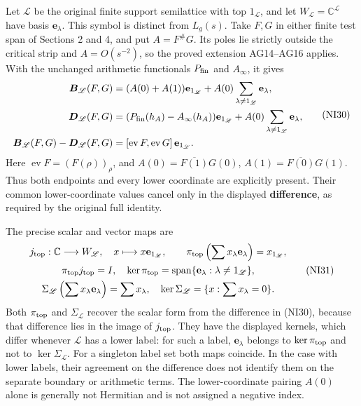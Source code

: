 \documentclass[
  10pt,
  a4paper,
]{article}
\begin{document}
Let \(\mathscr L\) be the original finite support semilattice with top
\(1_{\mathscr L}\), and let \(W_{\mathscr L}=\mathbb C^{\mathscr L}\)
have basis \(\mathbf e_\lambda\). This symbol is distinct from
\(L_g(s)\). Take \(F,G\) in either finite test span of Sections 2 and 4,
and put \(A=F^\#G\). Its poles lie strictly outside the critical strip
and \(A=O(s^{-2})\), so the proved extension AG14--AG16 applies. With
the unchanged arithmetic functionals \(P_{\rm fin}\) and \(A_\infty\),
it gives \[
\begin{split}
\boldsymbol B_{\mathscr L}(F,G)
&=(A(0)+A(1))\mathbf e_{1_{\mathscr L}}
+A(0)\sum_{\lambda\ne1_{\mathscr L}}\mathbf e_\lambda,\\
\boldsymbol D_{\mathscr L}(F,G)
&=(P_{\rm fin}(h_A)-A_\infty(h_A))\mathbf e_{1_{\mathscr L}}
+A(0)\sum_{\lambda\ne1_{\mathscr L}}\mathbf e_\lambda,\\
\boldsymbol B_{\mathscr L}(F,G)-\boldsymbol D_{\mathscr L}(F,G)
&=[\operatorname{ev}F,\operatorname{ev}G]\,\mathbf e_{1_{\mathscr L}}.
\end{split}
\tag{NI30}
\] Here \(\operatorname{ev}F=(F(\rho))_\rho\), and
\(A(0)=\overline{F(1)}G(0)\), \(A(1)=\overline{F(0)}G(1)\). Thus both
endpoints and every lower coordinate are explicitly present. Their
common lower-coordinate values cancel only in the displayed
\textbf{difference}, as required by the original full identity.

The precise scalar and vector maps are \[
\begin{gathered}
j_{\rm top}:\mathbb C\longrightarrow W_{\mathscr L},\quad
x\longmapsto x\mathbf e_{1_{\mathscr L}},\qquad
\pi_{\rm top}\left(\sum x_\lambda\mathbf e_\lambda\right)=x_{1_{\mathscr L}},\\
\pi_{\rm top}j_{\rm top}=I,\quad
\ker\pi_{\rm top}=\operatorname{span}\{\mathbf e_\lambda:\lambda\ne1_{\mathscr L}\},\\
\Sigma_{\mathscr L}\left(\sum x_\lambda\mathbf e_\lambda\right)=\sum x_\lambda,
\quad \ker\Sigma_{\mathscr L}=\{x:\sum x_\lambda=0\}.
\end{gathered}
\tag{NI31}
\] Both \(\pi_{\rm top}\) and \(\Sigma_{\mathscr L}\) recover the scalar
form from the difference in (NI30), because that difference lies in the
image of \(j_{\rm top}\). They have the displayed kernels, which differ
whenever \(\mathscr L\) has a lower label: for such a label,
\(\mathbf e_\lambda\) belongs to \(\ker\pi_{\rm top}\) and not to
\(\ker\Sigma_{\mathscr L}\). For a singleton label set both maps
coincide. In the case with lower labels, their agreement on the
difference does not identify them on the separate boundary or arithmetic
terms. The lower-coordinate pairing \(A(0)\) alone is generally not
Hermitian and is not assigned a negative index.
\end{document}
